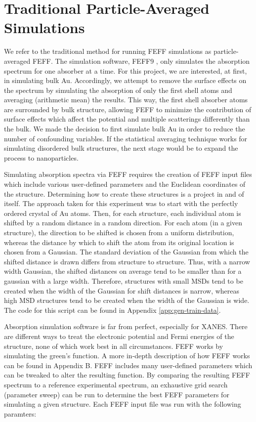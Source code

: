 \section{Traditional Particle-Averaged Simulations} 
\label{sec:traditional-disorder}
We refer to the traditional method for running FEFF simulations as particle-averaged FEFF. The simulation software, FEFF9 \cite{feff-citation}, only simulates the absorption spectrum for one absorber at a time. For this project, we are interested, at first, in simulating bulk Au. Accordingly, we attempt to remove the surface effects on the spectrum by simulating the absorption of only the first shell atoms and averaging (arithmetic mean) the results. This way, the first shell absorber atoms are surrounded by bulk structure, allowing FEFF to minimize the contribution of surface effects which affect the potential and multiple scatterings differently than the bulk. We made the decision to first simulate bulk Au in order to reduce the number of confounding variables. If the statistical averaging technique works for simulating disordered bulk structures, the next stage would be to expand the process to nanoparticles. 

Simulating absorption spectra via FEFF requires the creation of FEFF input files which include various user-defined parameters and the Euclidean coordinates of the structure. Determining how to create these structures is a project in and of itself. The approach taken for this experiment was to start with the perfectly ordered crystal of Au atoms. Then, for each structure, each individual atom is shifted by a random distance in a random direction. For each atom (in a given structure), the direction to be shifted is chosen from a uniform distribution, whereas the distance by which to shift the atom from its original location is chosen from a Gaussian. The standard deviation of the Gaussian from which the shifted distance is drawn differs from structure to structure. Thus, with a narrow width Gaussian, the shifted distances on average tend to be smaller than for a gaussian with a large width. Therefore, structures with small MSDs tend to be created when the width of the Gaussian for shift distances is narrow, whereas high MSD structures tend to be created when the width of the Gaussian is wide. The code for this script can be found in Appendix \ref{app:gen-train-data}.

Absorption simulation software is far from perfect, especially for XANES. There are different ways to treat the electronic potential and Fermi energies of the structure, none of which work best in all circumstances. FEFF works by simulating the green's function. A more in-depth description of how FEFF works can be found in Appendix B. FEFF includes many user-defined parameters which can be tweaked to alter the resulting function. By comparing the resulting FEFF spectrum to a reference experimental spectrum, an exhaustive grid search (parameter sweep) can be run to determine the best FEFF parameters for simulating a given structure. Each FEFF input file was run with the following paramters:

